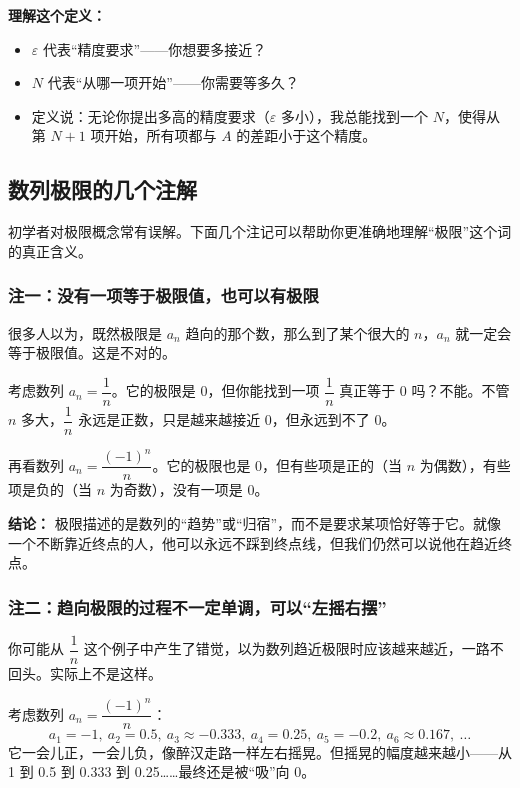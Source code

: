 \documentclass{ctexart}
\begin{document}
\textbf{理解这个定义：}
\begin{itemize}
\item \(\varepsilon\) 代表“精度要求”——你想要多接近？
\item \(N\) 代表“从哪一项开始”——你需要等多久？
\item 定义说：无论你提出多高的精度要求（\(\varepsilon\) 多小），我总能找到一个 \(N\)，使得从第 \(N+1\) 项开始，所有项都与 \(A\) 的差距小于这个精度。
\end{itemize}

\subsection{数列极限的几个注解}

初学者对极限概念常有误解。下面几个注记可以帮助你更准确地理解“极限”这个词的真正含义。

\subsubsection{注一：没有一项等于极限值，也可以有极限}

很多人以为，既然极限是 \(a_n\) 趋向的那个数，那么到了某个很大的 \(n\)，\(a_n\) 就一定会等于极限值。这是不对的。

考虑数列 \(a_n = \dfrac{1}{n}\)。它的极限是 0，但你能找到一项 \(\dfrac{1}{n}\) 真正等于 0 吗？不能。不管 \(n\) 多大，\(\dfrac{1}{n}\) 永远是正数，只是越来越接近 0，但永远到不了 0。

再看数列 \(a_n = \dfrac{(-1)^n}{n}\)。它的极限也是 0，但有些项是正的（当 \(n\) 为偶数），有些项是负的（当 \(n\) 为奇数），没有一项是 0。

\textbf{结论：} 极限描述的是数列的“趋势”或“归宿”，而不是要求某项恰好等于它。就像一个不断靠近终点的人，他可以永远不踩到终点线，但我们仍然可以说他在趋近终点。

\subsubsection{注二：趋向极限的过程不一定单调，可以“左摇右摆”}

你可能从 \(\dfrac{1}{n}\) 这个例子中产生了错觉，以为数列趋近极限时应该越来越近，一路不回头。实际上不是这样。

考虑数列 \(a_n = \dfrac{(-1)^n}{n}\)：
\[
a_1 = -1,\ a_2 = 0.5,\ a_3 \approx -0.333,\ a_4 = 0.25,\ a_5 = -0.2,\ a_6 \approx 0.167,\ \dots
\]
它一会儿正，一会儿负，像醉汉走路一样左右摇晃。但摇晃的幅度越来越小——从 1 到 0.5 到 0.333 到 0.25……最终还是被“吸”向 0。
\end{document}
